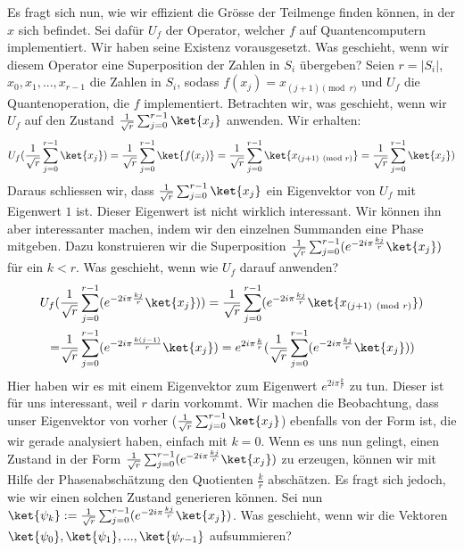 Es fragt sich nun, wie wir effizient die Grösse der Teilmenge finden können, in der $x$ sich befindet. Sei dafür $U_f$ der Operator, welcher $f$ auf Quantencomputern implementiert. Wir haben seine Existenz vorausgesetzt. Was geschieht, wenn wir diesem Operator eine Superposition der Zahlen in $S_i$ übergeben? Seien $r = |S_i|$, $x_0, x_1, ..., x_{r - 1}$ die Zahlen in $S_i$, sodass $f(x_j) = x_{(j + 1) \pmod{r}}$ und $U_f$ die Quantenoperation, die $f$ implementiert. Betrachten wir, was geschieht, wenn wir $U_f$ auf den Zustand $\frac{1}{\sqrt{r}}\sum_{j = 0}^{r - 1}\ket{x_j}$ anwenden. Wir erhalten:
\begin{align*}
    U_f(\frac{1}{\sqrt{r}}\sum_{j = 0}^{r - 1}\ket{x_j}) = \frac{1}{\sqrt{r}}\sum_{j = 0}^{r - 1}\ket{f(x_j)} = \frac{1}{\sqrt{r}}\sum_{j = 0}^{r - 1}\ket{x_{(j + 1) \pmod{r}}} = \frac{1}{\sqrt{r}}\sum_{j = 0}^{r - 1}\ket{x_j})
\end{align*}
Daraus schliessen wir, dass $\frac{1}{\sqrt{r}}\sum_{j = 0}^{r - 1}\ket{x_j}$ ein Eigenvektor von $U_f$ mit Eigenwert $1$ ist. Dieser Eigenwert ist nicht wirklich interessant. Wir können ihn aber interessanter machen, indem wir den einzelnen Summanden eine Phase mitgeben. Dazu konstruieren wir die Superposition $\frac{1}{\sqrt{r}}\sum_{j = 0}^{r - 1}(e^{-2i\pi\frac{kj}{r}}\ket{x_j})$ für ein $k < r$. Was geschieht, wenn wie $U_f$ darauf anwenden? 
\begin{align*}
    U_f(&\frac{1}{\sqrt{r}}\sum_{j = 0}^{r - 1}(e^{-2i\pi\frac{kj}{r}}\ket{x_j})) = \frac{1}{\sqrt{r}}\sum_{j = 0}^{r - 1}(e^{-2i\pi\frac{kj}{r}}\ket{x_{(j + 1) \pmod{r}}}) \\ =
    &\frac{1}{\sqrt{r}}\sum_{j = 0}^{r - 1}(e^{-2i\pi\frac{k(j - 1)}{r}}\ket{x_j}) = e^{2i\pi\frac{k}{r}}(\frac{1}{\sqrt{r}}\sum_{j = 0}^{r - 1}(e^{-2i\pi\frac{kj}{r}}\ket{x_j}))
\end{align*}
Hier haben wir es mit einem Eigenvektor zum Eigenwert $e^{2i\pi\frac{k}{r}}$ zu tun. Dieser ist für uns interessant, weil $r$ darin vorkommt. Wir machen die Beobachtung, dass unser Eigenvektor von vorher ($\frac{1}{\sqrt{r}}\sum_{j = 0}^{r - 1}\ket{x_j}$) ebenfalls von der Form ist, die wir gerade analysiert haben, einfach mit $k = 0$. Wenn es uns nun gelingt, einen Zustand in der Form $\frac{1}{\sqrt{r}}\sum_{j = 0}^{r - 1}(e^{-2i\pi\frac{kj}{r}}\ket{x_j})$ zu erzeugen, können wir mit Hilfe der Phasenabschätzung den Quotienten $\frac{k}{r}$ abschätzen. Es fragt sich jedoch, wie wir einen solchen Zustand generieren können. Sei nun $\ket{\psi_k} := \frac{1}{\sqrt{r}}\sum_{j = 0}^{r - 1}(e^{-2i\pi\frac{kj}{r}}\ket{x_j})$. Was geschieht, wenn wir die Vektoren $\ket{\psi_0}, \ket{\psi_1}, ..., \ket{\psi_{r - 1}}$ aufsummieren?
